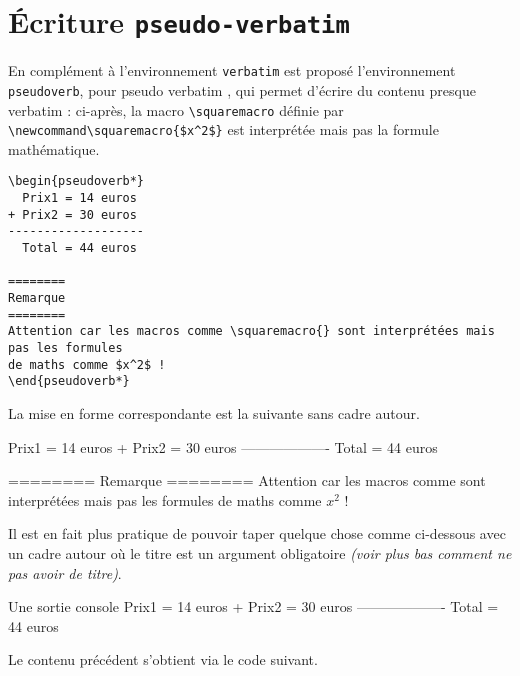 \documentclass[12pt,a4paper]{article}
\begin{document}
\section{Écriture \texttt{pseudo-verbatim}}

En complément à l'environnement \verb+verbatim+ est proposé l'environnement \verb+pseudoverb+, pour \og pseudo verbatim \fg, qui permet d'écrire du contenu presque verbatim : ci-après, la macro \verb+\squaremacro+ définie par \verb+\newcommand\squaremacro{$x^2$}+ est interprétée mais pas la formule mathématique. 

\begin{frame-gene}
	\small
	\begin{verbatim}
\begin{pseudoverb*}
  Prix1 = 14 euros 
+ Prix2 = 30 euros
-------------------
  Total = 44 euros

========
Remarque
========
Attention car les macros comme \squaremacro{} sont interprétées mais pas les formules
de maths comme $x^2$ !
\end{pseudoverb*} 
	\end{verbatim}
\end{frame-gene}


La mise en forme correspondante est la suivante sans cadre autour.

\begin{frame-gene}
	\begin{pseudoverb*}
  Prix1 = 14 euros
+ Prix2 = 30 euros
-------------------
  Total = 44 euros

========
Remarque
========
Attention car les macros comme \squaremacro{} sont interprétées mais pas les formules
de maths comme $x^2$ !
	\end{pseudoverb*} 
\end{frame-gene}


\medskip


Il est en fait plus pratique de pouvoir taper quelque chose comme ci-dessous avec un cadre autour où le titre est un argument obligatoire \emph{(voir plus bas comment ne pas avoir de titre)}.

\begin{pseudoverb}{Une sortie console}
  Prix1 = 14 euros
+ Prix2 = 30 euros
-------------------
  Total = 44 euros
\end{pseudoverb} 


Le contenu précédent s'obtient via le code suivant.
\end{document}
